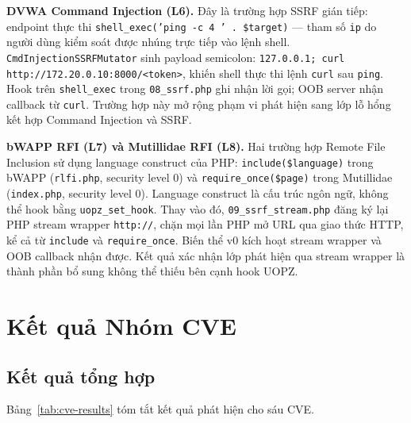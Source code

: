 \textbf{DVWA Command Injection (L6).} Đây là trường hợp SSRF gián tiếp:
endpoint thực thi \texttt{shell\_exec('ping -c 4 ' . \$target)} ---
tham số \texttt{ip} do người dùng kiểm soát được nhúng trực tiếp vào
lệnh shell. \texttt{CmdInjectionSSRFMutator} sinh payload semicolon:
\texttt{127.0.0.1; curl http://172.20.0.10:8000/<token>}, khiến shell
thực thi lệnh \texttt{curl} sau \texttt{ping}. Hook trên
\texttt{shell\_exec} trong \texttt{08\_ssrf.php} ghi nhận lời gọi; OOB
server nhận callback từ \texttt{curl}. Trường hợp này mở rộng phạm vi
phát hiện sang lớp lỗ hổng kết hợp Command Injection và SSRF.

\textbf{bWAPP RFI (L7) và Mutillidae RFI (L8).} Hai trường hợp Remote
File Inclusion sử dụng language construct của PHP: \texttt{include(\$language)}
trong bWAPP (\texttt{rlfi.php}, security level 0) và
\texttt{require\_once(\$page)} trong Mutillidae (\texttt{index.php},
security level 0). Language construct là cấu trúc ngôn ngữ, không thể
hook bằng \texttt{uopz\_set\_hook}. Thay vào đó,
\texttt{09\_ssrf\_stream.php} đăng ký lại PHP stream wrapper
\texttt{http://}, chặn mọi lần PHP mở URL qua giao thức HTTP, kể cả từ
\texttt{include} và \texttt{require\_once}. Biến thể v0 kích hoạt stream
wrapper và OOB callback nhận được. Kết quả xác nhận lớp phát hiện qua
stream wrapper là thành phần bổ sung không thể thiếu bên cạnh hook UOPZ.

\section{Kết quả Nhóm CVE}
\label{sec:exp-cve}

\subsection{Kết quả tổng hợp}

Bảng~\ref{tab:cve-results} tóm tắt kết quả phát hiện cho sáu CVE.

